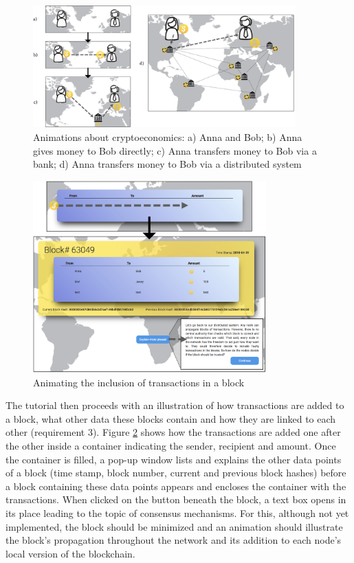 \begin{figure}
    \centering
      \includegraphics[width=0.9\textwidth]{latex-vorlage_v1.5/graphics/Animations2.png} 
    \caption{Animations about cryptoeconomics: a) Anna and Bob; b) Anna gives money to Bob directly; c) Anna transfers money to Bob via a bank; d) Anna transfers money to Bob via a distributed system}
    \label{fig:Animationline}
\end{figure}


\begin{figure}
    \centering
      \includegraphics[width=0.8\textwidth]{latex-vorlage_v1.5/graphics/Animations3Block.png} 
    \caption{Animating the inclusion of transactions in a block}
    \label{fig:AnimationBlock}
\end{figure}

The tutorial then proceeds with an illustration of how transactions are added to a block, what other data these blocks contain and how they are linked to each other (requirement 3). Figure \ref{fig:AnimationBlock} shows how the transactions are added one after the other inside a container indicating the sender, recipient and amount. Once the container is filled, a pop-up window lists and explains the other data points of a block (time stamp, block number, current and previous block hashes) before a block containing these data points appears and encloses the container with the transactions. When clicked on the button beneath the block, a text box opens in its place leading to the topic of consensus mechanisms. For this, although not yet implemented, the block should be minimized and an animation should illustrate the block's propagation throughout the network and its addition to each node's local version of the blockchain.

